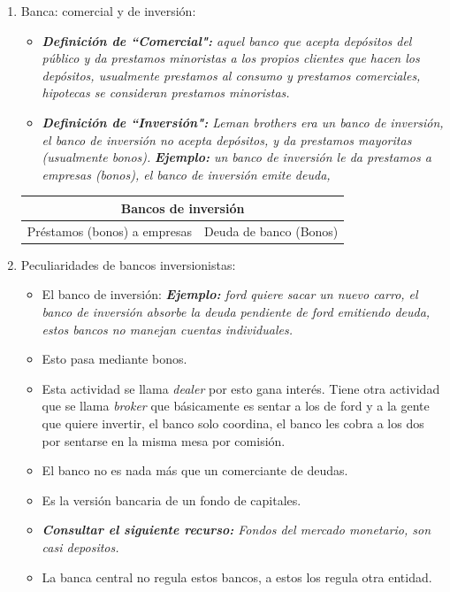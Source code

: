 \begin{enumerate}
    \item Banca: comercial y de inversión:
        \begin{itemize}
            \item \emph{\textbf{Definición de ``Comercial":} aquel banco que acepta depósitos del público y da prestamos minoristas a los propios clientes que hacen los depósitos, usualmente prestamos al consumo y prestamos comerciales, hipotecas se consideran prestamos minoristas.}
            \item \emph{\textbf{Definición de ``Inversión":} Leman brothers era un banco de inversión, el banco de inversión no acepta depósitos, y da prestamos mayoritas (usualmente bonos).} \emph{\textbf{Ejemplo: }un banco de inversión le da prestamos a empresas (bonos), el banco de inversión emite deuda,  }
        \end{itemize}
        \begin{center}
        \begin{tabular}{ | p{7cm} | p{7cm} | }
            \hline
            \multicolumn{2}{|c|}{Bancos de inversión} \\
            \hline
                Préstamos (bonos) a empresas  & Deuda de banco (Bonos) \\
            \hline
        \end{tabular}
    \end{center}

    \item Peculiaridades de bancos inversionistas: 
        \begin{itemize}
            \item El banco de inversión: \emph{\textbf{Ejemplo: }ford quiere sacar un nuevo carro, el banco de inversión absorbe la deuda pendiente de ford emitiendo deuda, estos bancos no manejan cuentas individuales.}
            \item Esto pasa mediante bonos.
            \item Esta actividad se llama \emph{dealer} por esto gana interés. Tiene otra actividad que se llama \emph{broker} que básicamente es sentar a los de ford y a la gente que quiere invertir, el banco solo coordina, el banco les cobra a los dos por sentarse en la misma mesa por comisión.  
            \item El banco no es nada más que un comerciante de deudas.
            \item Es la versión bancaria de un fondo de capitales.
            \item \emph{\textbf{Consultar el siguiente recurso:} Fondos del mercado monetario, son casi depositos.}
            \item La banca central no regula estos bancos, a estos los regula otra entidad.
        \end{itemize}
\end{enumerate}



